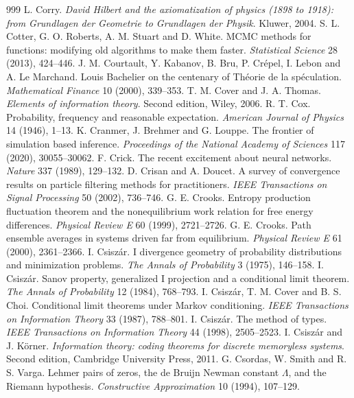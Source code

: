 \begin{thebibliography}{999}
 L. Corry. \emph{David Hilbert and the axiomatization of physics (1898 to 1918): from Grundlagen der Geometrie to Grundlagen der Physik}. Kluwer, 2004.
 S. L. Cotter, G. O. Roberts, A. M. Stuart and D. White. MCMC methods for functions: modifying old algorithms to make them faster. \emph{Statistical Science} 28 (2013), 424--446.
 J. M. Courtault, Y. Kabanov, B. Bru, P. Cr\'epel, I. Lebon and A. Le Marchand. Louis Bachelier on the centenary of Th\'eorie de la sp\'eculation. \emph{Mathematical Finance} 10 (2000), 339--353.
 T. M. Cover and J. A. Thomas. \emph{Elements of information theory}. Second edition, Wiley, 2006.
 R. T. Cox. Probability, frequency and reasonable expectation. \emph{American Journal of Physics} 14 (1946), 1--13.
 K. Cranmer, J. Brehmer and G. Louppe. The frontier of simulation based inference. \emph{Proceedings of the National Academy of Sciences} 117 (2020), 30055--30062.
 F. Crick. The recent excitement about neural networks. \emph{Nature} 337 (1989), 129--132.
 D. Crisan and A. Doucet. A survey of convergence results on particle filtering methods for practitioners. \emph{IEEE Transactions on Signal Processing} 50 (2002), 736--746.
 G. E. Crooks. Entropy production fluctuation theorem and the nonequilibrium work relation for free energy differences. \emph{Physical Review E} 60 (1999), 2721--2726.
 G. E. Crooks. Path ensemble averages in systems driven far from equilibrium. \emph{Physical Review E} 61 (2000), 2361--2366.
 I. Csisz\'ar. I divergence geometry of probability distributions and minimization problems. \emph{The Annals of Probability} 3 (1975), 146--158.
 I. Csisz\'ar. Sanov property, generalized I projection and a conditional limit theorem. \emph{The Annals of Probability} 12 (1984), 768--793.
 I. Csisz\'ar, T. M. Cover and B. S. Choi. Conditional limit theorems under Markov conditioning. \emph{IEEE Transactions on Information Theory} 33 (1987), 788--801.
 I. Csisz\'ar. The method of types. \emph{IEEE Transactions on Information Theory} 44 (1998), 2505--2523.
 I. Csisz\'ar and J. K\"orner. \emph{Information theory: coding theorems for discrete memoryless systems}. Second edition, Cambridge University Press, 2011.
 G. Csordas, W. Smith and R. S. Varga. Lehmer pairs of zeros, the de Bruijn Newman constant $\Lambda$, and the Riemann hypothesis. \emph{Constructive Approximation} 10 (1994), 107--129.

\end{thebibliography}
